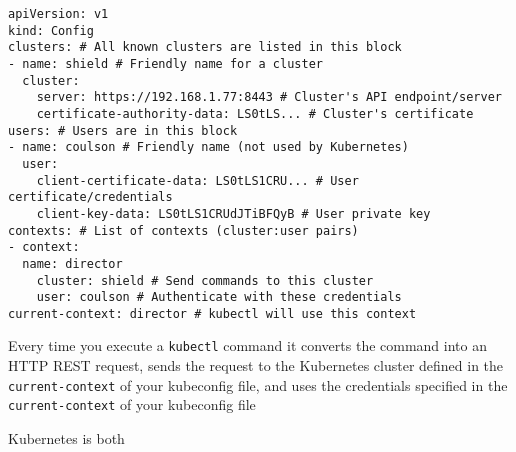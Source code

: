 \documentclass[8pt, table, xcdraw]{article}%
\begin{document}
\begin{lstlisting}
apiVersion: v1
kind: Config
clusters: # All known clusters are listed in this block
- name: shield # Friendly name for a cluster
  cluster:
	server: https://192.168.1.77:8443 # Cluster's API endpoint/server
	certificate-authority-data: LS0tLS... # Cluster's certificate
users: # Users are in this block
- name: coulson # Friendly name (not used by Kubernetes)
  user:
	client-certificate-data: LS0tLS1CRU... # User certificate/credentials
	client-key-data: LS0tLS1CRUdJTiBFQyB # User private key
contexts: # List of contexts (cluster:user pairs)
- context:
  name: director
	cluster: shield # Send commands to this cluster
	user: coulson # Authenticate with these credentials
current-context: director # kubectl will use this context
\end{lstlisting}

Every time you execute a \lstinline{kubectl} command it converts the command into an HTTP REST request, sends the request to the Kubernetes cluster defined in the \lstinline{current-context} of your kubeconfig file, and uses the credentials specified in the \lstinline{current-context} of your kubeconfig file

Kubernetes is both
\end{document}

